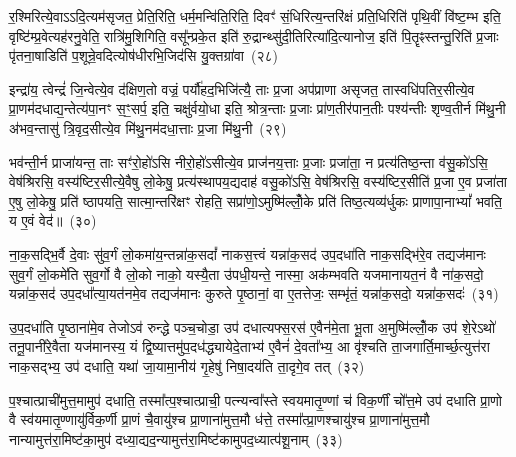 {\anuvakamend[{उ॒त्त॒र॒तो ध॑त्ते॒ तस्मा॑दुपधी॒यन्त॒ ऋष॑यो\-ऽसृजत॒ यत्त्रिच॑त्वारिꣳशच्च}]}%

र॒श्मिरित्ये॒वाऽऽदि॒त्यम॑सृजत॒ प्रेति॒रिति॒ धर्म॒मन्वि॑ति॒रिति॒ दिवꣳ॑ सं॒धिरित्य॒न्तरि॑क्षं प्रति॒धिरिति॑ पृथि॒वीं वि॑ष्ट॒म्भ इति॒ वृष्टि॑म्प्र॒वेत्यह॑रनु॒वेति॒ रात्रि॑मु॒शिगिति॒ वसू᳚न्प्रके॒त इति॑ रु॒द्रान्थ्सु॑दी॒तिरित्या॑दि॒त्यानोज॒ इति॑ पि॒तॄꣴस्तन्तु॒रिति॑ प्र॒जाः पृ॑तना॒षाडिति॑ प॒शून्रे॒वदित्योष॑धीरभि॒जिद॑सि यु॒क्तग्रा॑वा~(२८)

इन्द्रा॑य॒ त्वेन्द्रं॑ जि॒न्वेत्ये॒व द॑क्षिण॒तो वज्रं॒ पर्यौ॑हद॒भिजि॑त्यै॒ ताः प्र॒जा अप॑प्राणा असृजत॒ तास्वधि॑पतिर॒सीत्ये॒व प्रा॒णम॑दधाद्य॒न्तेत्य॑पा॒नꣳ स॒ꣳ॒सर्प॒ इति॒ चक्षु॑र्वयो॒धा इति॒ श्रोत्र॒न्ताः प्र॒जाः प्रा॑ण॒तीर॑पान॒तीः पश्य॑न्तीः शृण्व॒तीर्न मि॑थु॒नी अ॑भव॒न्तासु॑ त्रि॒वृद॒सीत्ये॒व मि॑थु॒नम॑दधा॒त्ताः प्र॒जा मि॑थु॒नी~(२९)

भव॑न्ती॒र्न प्राजा॑यन्त॒ ताः सꣳ॑रो॒हो॑\-ऽसि नीरो॒हो॑\-ऽसीत्ये॒व प्राज॑नय॒त्ताः प्र॒जाः प्रजा॑ता॒ न प्रत्य॑तिष्ठ॒न्ता व॑सु॒को॑\-ऽसि॒ वेष॑श्रिरसि॒ वस्य॑ष्टिर॒सीत्ये॒वैषु लो॒केषु॒ प्रत्य॑स्थापय॒द्यदाह॑ वसु॒को॑\-ऽसि॒ वेष॑श्रिरसि॒ वस्य॑ष्टिर॒सीति॑ प्र॒जा ए॒व प्रजा॑ता ए॒षु लो॒केषु॒ प्रति॑ ष्ठापयति॒ सात्मा॒न्तरि॑क्षꣳ रोहति॒ सप्रा॑णो॒\-ऽमुष्मि॑ल्लोँ॒के प्रति॑ तिष्ठ॒त्यव्य॑र्धुकः प्राणापा॒ना\-भ्यां᳚ भवति॒ य ए॒वं वेद॑॥~(३०)

{\anuvakamend[{यु॒क्तग्रा॑वा प्र॒जा मि॑थु॒न्य॑न्तरि॑क्ष॒न्द्वाद॑श च}]}%

ना॒क॒सद्भि॒र्वै दे॒वाः सु॑व॒र्गं लो॒कमा॑य॒न्तन्ना॑क॒सदां᳚ नाकस॒त्त्वं यन्ना॑क॒सद॑ उप॒दधा॑ति नाक॒सद्भि॑रे॒व तद्यज॑मानः सुव॒र्गं लो॒कमे॑ति सुव॒र्गो वै लो॒को नाको॒ यस्यै॒ता उ॑पधी॒यन्ते॒ नास्मा॒ अक॑म्भवति यजमानायत॒नं वै ना॑क॒सदो॒ यन्ना॑क॒सद॑ उप॒दधा᳚त्या॒यत॑नमे॒व तद्यज॑मानः कुरुते पृ॒ष्ठानां॒ वा ए॒तत्तेजः॒ सम्भृ॑तं॒ यन्ना॑क॒सदो॒ यन्ना॑क॒सदः॑~(३१)

उ॒प॒दधा॑ति पृ॒ष्ठाना॑मे॒व तेजो\-ऽव॑ रुन्द्धे पञ्च॒चोडा॒ उप॑ दधात्यफ्स॒रस॑ ए॒वैन॑मे॒ता भू॒ता अ॒मुष्मि॑ल्लोँ॒क उप॑ शे॒रे\-ऽथो॑ तनू॒पानी॑रे॒वैता यज॑मानस्य॒ यं द्वि॒ष्यात्तमु॑प॒दध॑द्ध्यायेदे॒ताभ्य॑ ए॒वैनं॑ दे॒वता᳚भ्य॒ आ वृ॑श्चति ता॒जगार्ति॒मार्च्छ॒त्युत्त॑रा नाक॒सद्भ्य॒ उप॑ दधाति॒ यथा॑ जा॒यामा॒नीय॑ गृ॒हेषु॑ निषा॒दय॑ति ता॒दृगे॒व तत्~(३२)

प॒श्चात्प्राची॑मुत्त॒मामुप॑ दधाति॒ तस्मा᳚त्प॒श्चात्प्राची॒ पत्न्यन्वा᳚स्ते स्वयमातृ॒ण्णां च॑ विक॒र्णीं चो᳚त्त॒मे उप॑ दधाति प्रा॒णो वै स्व॑यमातृ॒ण्णायु॑र्विक॒र्णी प्रा॒णं चै॒वायु॑श्च प्रा॒णाना॑मुत्त॒मौ ध॑त्ते॒ तस्मा᳚त्प्रा॒णश्चायु॑श्च प्रा॒णाना॑मुत्त॒मौ नान्यामुत्त॑रा॒मिष्ट॑का॒मुप॑ दध्या॒द्यद॒न्यामुत्त॑रा॒मिष्ट॑कामुपद॒ध्यात्प॑शू॒नाम्~(३३)

